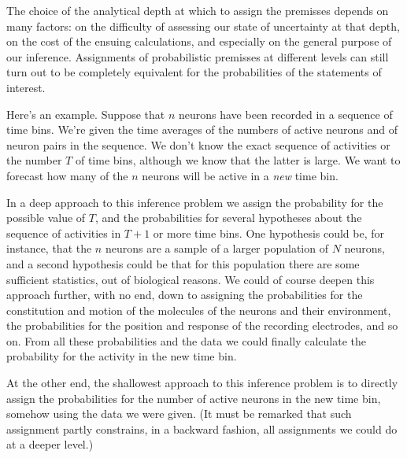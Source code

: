 \documentclass[\ifafour a4paper,12pt,\else a5paper,10pt,\fi%
onecolumn,oneside,article,%
british%
]{memoir}
\theoremstyle{remark}
\theoremstyle{innote}
\renewcommand*{\|}{\nonscript\,\vert\nonscript\;\mathopen{}}
\begin{document}
The choice of the analytical depth at which to assign the premisses depends
on many factors: on the difficulty of assessing our state of uncertainty at
that depth, on the cost of the ensuing calculations, and especially on the
general purpose of our inference. Assignments of probabilistic premisses at
different levels can still turn out to be completely equivalent for the
probabilities of the statements of interest.


Here's an example. Suppose that $n$ neurons have been recorded in a
sequence of time bins. We're given the time averages of the numbers of
active neurons and of neuron pairs in the sequence. We don't know the exact
sequence of activities or the number $T$ of time bins, although we know
that the latter is large. We want to forecast how many of the $n$ neurons
will be active in a \emph{new} time bin.

In a deep approach to this inference problem we assign the probability for
the possible value of $T$, and the probabilities for several hypotheses
about the sequence of activities in $T+1$ or more time bins. One hypothesis
could be, for instance, that the $n$ neurons are a sample of a larger
population of $N$ neurons, and a second hypothesis could be that for this
population there are some sufficient statistics, out of biological reasons.
We could of course deepen this approach further, with no end, down to
assigning the probabilities for the constitution and motion of the
molecules of the neurons and their environment, the probabilities for the
position and response of the recording electrodes, and so on. From all
these probabilities and the data we could finally calculate the probability
for the activity in the new time bin.

At the other end, the shallowest approach to this inference problem is to
directly assign the probabilities for the number of active neurons in the
new time bin, somehow using the data we were given. (It must be remarked
that such assignment partly constrains, in a backward fashion, all
assignments we could do at a deeper level.)
\end{document}
